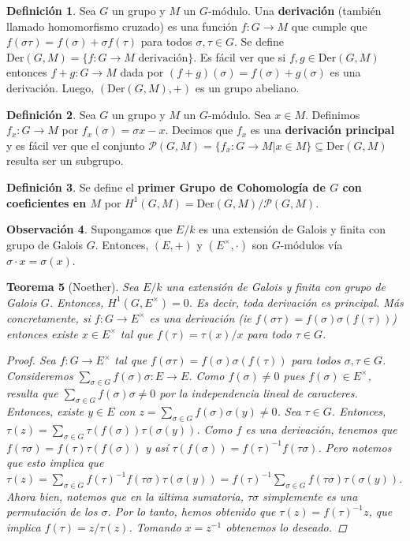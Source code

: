 \documentclass[12pt]{book}
\newtheorem{teo}{Teorema}[section]
\theoremstyle{definition}
\newtheorem{obs}[teo]{Observación}
\newtheorem{defn}[teo]{Definición}
\begin{document}
\begin{defn}
Sea $G$ un grupo y $M$ un $G$-módulo. Una \textbf{derivación} (también llamado homomorfismo cruzado) es una función $f:G\to M$ que cumple que $f(\sigma\tau) = f(\sigma) + \sigma f(\tau)$ para todos $\sigma,\tau\in G$. Se define $\mathrm{Der}(G,M)=\{f:G\to M \text{ derivación}\}$. Es fácil ver que si $f,g\in\mathrm{Der}(G,M)$ entonces $f+g:G\to M$ dada por $(f+g)(\sigma) = f(\sigma) + g(\sigma)$ es una derivación. Luego, $(\mathrm{Der}(G,M),+)$ es un grupo abeliano.
\end{defn}

\begin{defn}
Sea $G$ un grupo y $M$ un $G$-módulo. Sea $x\in M$. Definimos $f_x:G\to M$ por $f_x(\sigma) = \sigma x - x$. Decimos que $f_x$ es una \textbf{derivación principal} y es fácil ver que el conjunto $\mathscr{P}(G,M) = \{f_x :G\to M | x\in M\}\subseteq \mathrm{Der}(G,M)$ resulta ser un subgrupo.
\end{defn}

\begin{defn}
Se define el \textbf{primer Grupo de Cohomología de $G$ con coeficientes en $M$} por $H^1(G,M) = \mathrm{Der}(G,M)/\mathscr{P}(G,M)$.
\end{defn}

\begin{obs}
Supongamos que $E/k$ es una extensión de Galois y finita con grupo de Galois $G$. Entonces, $(E,+)$ y $(E^\times,\cdot)$ son $G$-módulos vía $\sigma\cdot x = \sigma(x)$.
\end{obs}

\begin{teo}[Noether] Sea $E/k$ una extensión de Galois y finita con grupo de Galois $G$. Entonces, $H^1(G,E^\times)=0$. Es decir, toda derivación es principal. Más concretamente, si $f:G\to E^\times$ es una derivación (ie $f(\sigma\tau) = f(\sigma)\sigma(f(\tau))$) entonces existe $x\in E^\times$ tal que $f(\tau) = \tau(x)/x$ para todo $\tau\in G$.
\begin{proof}
Sea $f:G\to E^\times$ tal que $f(\sigma\tau)=f(\sigma)\sigma(f(\tau))$ para todos $\sigma,\tau\in G$. Consideremos $\displaystyle\sum_{\sigma\in G}f(\sigma)\sigma:E\to E$. Como $f(\sigma)\neq 0$ pues $f(\sigma)\in E^\times$, resulta que $\displaystyle\sum_{\sigma\in G}f(\sigma)\sigma\neq 0$ por la independencia lineal de caracteres. Entonces, existe $y\in E$ con $z=\displaystyle\sum_{\sigma\in G}f(\sigma)\sigma(y)\neq 0$. Sea $\tau\in G$. Entonces, $\tau(z)=\displaystyle\sum_{\sigma\in G}\tau(f(\sigma)) \tau(\sigma(y))$. Como $f$ es una derivación, tenemos que $f(\tau\sigma) = f(\tau)\tau(f(\sigma))$ y así $\tau(f(\sigma)) = f(\tau)^{-1}f(\tau\sigma)$. Pero notemos que esto implica que $\tau(z)=\displaystyle\sum_{\sigma\in G}f(\tau)^{-1}f(\tau\sigma)\tau(\sigma(y)) = f(\tau)^{-1}\displaystyle\sum_{\sigma\in G}f(\tau\sigma)\tau(\sigma(y))$. Ahora bien, notemos que en la última sumatoria, $\tau\sigma$ simplemente es una permutación de los $\sigma$. Por lo tanto, hemos obtenido que $\tau(z) = f(\tau)^{-1} z$, que implica $f(\tau) = z/\tau(z)$. Tomando $x = z^{-1}$ obtenemos lo deseado.
\end{proof}
\end{teo}
\end{document}
